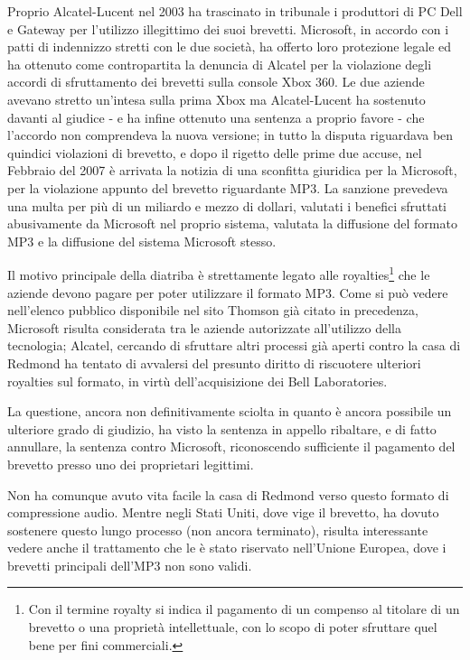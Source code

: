Proprio Alcatel-Lucent nel 2003 ha trascinato in tribunale i produttori di PC Dell e Gateway per l'utilizzo illegittimo dei suoi brevetti. Microsoft, in accordo con i patti di indennizzo stretti con le due società, ha offerto loro protezione legale ed ha ottenuto come contropartita la denuncia di Alcatel per la violazione degli accordi di sfruttamento dei brevetti sulla console Xbox 360. Le due aziende avevano stretto un'intesa sulla prima Xbox ma Alcatel-Lucent ha sostenuto davanti al giudice - e ha infine ottenuto una sentenza a proprio favore - che l'accordo non comprendeva la nuova versione; in tutto la disputa riguardava ben quindici violazioni di brevetto, e dopo il rigetto delle prime due accuse, nel Febbraio del 2007 è arrivata la notizia di una sconfitta giuridica per la Microsoft, per la violazione appunto del brevetto riguardante MP3. La sanzione prevedeva una multa per più di un miliardo e mezzo di dollari, valutati i benefici sfruttati abusivamente da Microsoft nel proprio sistema, valutata la diffusione del formato MP3 e la diffusione del sistema Microsoft stesso.

Il motivo principale della diatriba è strettamente legato alle royalties\footnote{Con il termine royalty si indica il pagamento di un compenso al titolare di un brevetto o una proprietà intellettuale, con lo scopo di poter sfruttare quel bene per fini commerciali.} che le aziende devono pagare per poter utilizzare il formato MP3. Come si può vedere nell'elenco pubblico disponibile nel sito Thomson già citato in precedenza, Microsoft risulta considerata tra le aziende autorizzate all'utilizzo della tecnologia; Alcatel, cercando di sfruttare altri processi già aperti contro la casa di Redmond ha tentato di avvalersi del presunto diritto di riscuotere ulteriori royalties sul formato, in virtù dell'acquisizione dei Bell Laboratories.

La questione, ancora non definitivamente sciolta in quanto è ancora possibile un ulteriore grado di giudizio, ha visto la sentenza in appello ribaltare, e di fatto annullare, la sentenza contro Microsoft, riconoscendo sufficiente il pagamento del brevetto presso uno dei proprietari legittimi.

Non ha comunque avuto vita facile la casa di Redmond verso questo formato di compressione audio. Mentre negli Stati Uniti, dove vige il brevetto, ha dovuto sostenere questo lungo processo (non ancora terminato), risulta interessante vedere anche il trattamento che le è stato riservato nell'Unione Europea, dove i brevetti principali dell'MP3 non sono validi.

